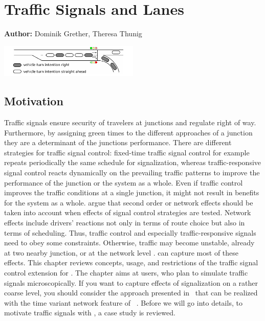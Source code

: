 \chapter{Traffic Signals and Lanes}
\label{ch:signalslanes}

\hfill \textbf{Author:} Dominik Grether, Theresa Thunig

\begin{center} \includegraphics[width=0.5\textwidth, angle=0]{extending/figures/signalslanes/single_queue_model_inkscape.pdf} \end{center}


\section{Motivation}
Traffic signals ensure security of travelers at junctions and regulate right of way. 
Furthermore, by assigning green times to the different approaches of a junction they are a determinant of the junctions performance. 
There are different strategies for traffic signal control: fixed-time traffic signal control for example repeats periodically the same schedule for signalization, whereas traffic-responsive signal control reacts dynamically on the prevailing traffic patterns to improve the performance of the junction or the system as a whole.   
Even if traffic control improves the traffic conditions at a single junction, it might not result in benefits for the system as a whole. 
\citet{Hu1997D2DFlowEvolutionReactiveSignalsDynasmart} argue that second order or network effects should be taken into account when effects of signal control strategies are tested. Network effects include drivers' reactions not only in terms of route choice but also in terms of scheduling. 
Thus, traffic control and especially traffic-responsive signals need to obey some constraints. Otherwise, traffic may become unstable, already at two nearby junction, or at the network level \citep{LaemmerHelbing2010SelfStabilizingSignalControlRealNet}.  can capture most of these effects. This chapter reviews concepts, usage, and restrictions of the traffic signal control extension for . 
The chapter aims at  users, who plan to simulate traffic signals microscopically. 
If you want to capture effects of signalization on a rather coarse level, you should consider the approach presented in~\citet[pp.~139][]{Charypar2008PhD} that can be realized with the time variant network feature of ~\citep{LaemmelGretherNagel2009TimeDependentNetworks}. 
Before we will go into details, to motivate traffic signals with , a case study is reviewed. 

